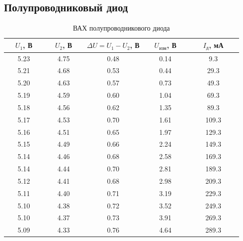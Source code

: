 \subsection{Полупроводниковый диод}

\begin{table}[H]
	\begin{center}
	\caption{ВАХ полупроводникового диода}
	\def\arraystretch{1.5}
		\begin{tabular}{|c|c|c|c|c|}
		\hline 
		\ \ $U_1$, В\ \  & \ \ $U_2$, В\ \  & $\Delta U = U_1 - U_2$, В & \ \ $U_\text{изм}$, В\ \  & \ \ \ $I_\text{д}$, мА\ \ \ \\ 
		\hline 
		5.23 & 4.75 & 0.48 & 0.14 & 9.3 \\ 
		\hline 
		5.21 & 4.68 & 0.53 & 0.44 & 29.3 \\ 
		\hline 
		5.20 & 4.63 & 0.57 & 0.73 & 49.3 \\ 
		\hline 
		5.19 & 4.59 & 0.60 & 1.04 & 69.3 \\ 
		\hline 
		5.18 & 4.56 & 0.62 & 1.35 & 89.3 \\ 
		\hline 
		5.17 & 4.53 & 0.70 & 1.61 & 109.3 \\ 
		\hline 
		5.16 & 4.51 & 0.65 & 1.97 & 129.3 \\ 
		\hline 
		5.15 & 4.49 & 0.66 & 2.24 & 149.3 \\ 
		\hline 
		5.14 & 4.46 & 0.68 & 2.58 & 169.3 \\ 
		\hline 
		5.14 & 4.44 & 0.70 & 2.81 & 189.3 \\ 
		\hline 
		5.12 & 4.41 & 0.68 & 2.98 & 209.3 \\ 
		\hline 
		5.11 & 4.40 & 0.71 & 3.19 & 229.3 \\ 
		\hline 
		5.10 & 4.38 & 0.72 & 3.52 & 249.3 \\ 
		\hline 
		5.10 & 4.37 & 0.73 & 3.91 & 269.3 \\ 
		\hline 
		5.09 & 4.33 & 0.76 & 4.64 & 289.3 \\ 
		\hline 
		\end{tabular} 
		\label{tab:5:1}
	\end{center}
\end{table}

